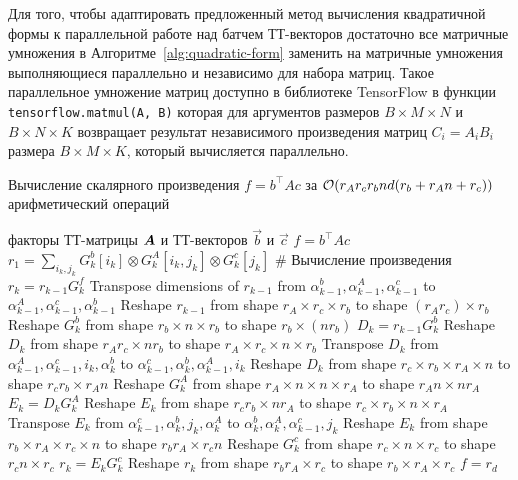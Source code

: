 Для того, чтобы адаптировать предложенный метод вычисления квадратичной формы к параллельной работе над батчем ТТ-векторов достаточно все матричные умножения в Алгоритме~\ref{alg:quadratic-form} заменить на матричные умножения выполняющиеся параллельно и независимо для набора матриц. Такое параллельное умножение матриц доступно в библиотеке TensorFlow в функции \texttt{tensorflow.matmul(A, B)} которая для аргументов размеров $B \times M \times N$ и $B \times N \times K$ возвращает результат независимого произведения матриц $C_i = A_i B_i$ размера $B \times M \times K$, который вычисляется параллельно.
%
\begin{algorithm}[tb]
   \caption{Вычисление скалярного произведения $f = b^\intercal A c$ за $\mathcal{O}(r_A r_c r_b n d (r_b + r_A n + r_c))$ арифметический операций}
   \label{alg:bilinear-form}
\begin{algorithmic}[1]
   \REQUIRE факторы ТТ-матрицы $\boldsymbol{A}$ и ТТ-векторов $\vec{b}$ и $\vec{c}$
   \ENSURE $f = b^\intercal A c$
   \STATE $r_1 = \sum_{i_k, j_k} G_k^b[i_k] \otimes G_k^A[i_k, j_k] \otimes G_k^c[j_k]$
   \STATE \# Вычисление произведения $r_k = r_{k-1}G_k^f$
   \STATE Transpose dimensions of $r_{k-1}$ from $\alpha_{k-1}^b,\alpha_{k-1}^A, \alpha_{k-1}^c$ to $\alpha_{k-1}^A, \alpha_{k-1}^c,\alpha_{k-1}^b$
   \STATE Reshape $r_{k-1}$ from shape $r_A \times r_c \times r_b$ to shape $(r_A  r_c) \times r_b$
   \STATE Reshape $G_k^b$ from shape $r_b \times n \times r_b$ to shape $r_b \times (n r_b)$
   \STATE $D_k = r_{k-1} G_k^b$ 
   \STATE Reshape $D_k$ from shape $r_A r_c \times n r_b$ to shape $r_A \times r_c \times n \times r_b$
   \STATE Transpose $D_k$ from $\alpha_{k-1}^A, \alpha_{k-1}^c,i_k,\alpha_{k}^b$ to $\alpha_{k-1}^c,\alpha_{k}^b,\alpha_{k-1}^A,i_k$
   \STATE Reshape $D_k$ from shape $r_c \times r_b \times r_A \times n$ to shape $r_c r_b \times r_A n$
   \STATE Reshape $G_k^A$ from shape $r_A \times n \times n \times r_A$ to shape $r_A n \times n r_A$
   \STATE $E_k = D_k G_k^A$ 
   \STATE Reshape $E_k$ from shape $r_c r_b \times n r_A$ to shape $r_c \times r_b \times n \times r_A$
   \STATE Transpose $E_k$ from $\alpha_{k-1}^c, \alpha_{k}^b,j_k,\alpha_{k}^A$ to $\alpha_{k}^b,\alpha_{k}^A,\alpha_{k-1}^c,j_k$
   \STATE Reshape $E_k$ from shape $r_b \times r_A \times r_c \times n$ to shape $r_b r_A \times r_c n$
   \STATE Reshape $G_k^c$ from shape $r_c \times n \times r_c$ to shape $r_c n \times r_c$
   \STATE $r_k = E_k G_k^c$ 
   \STATE Reshape $r_k$ from shape $r_b r_A \times r_c$ to shape $r_b \times r_A \times r_c$
   \ENDFOR
   \STATE $f = r_d$
\end{algorithmic}
\end{algorithm}




